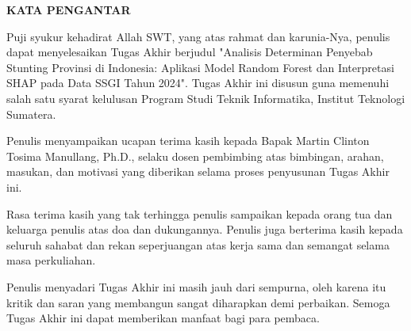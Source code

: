 \clearpage
{}%

\begin{justifying}
	\large \bfseries \centering \MakeUppercase{Kata Pengantar}\linebreak
	
	\normalsize \normalfont \justifying
	Puji syukur kehadirat Allah SWT, yang atas rahmat dan karunia-Nya, penulis dapat menyelesaikan Tugas Akhir berjudul "Analisis Determinan Penyebab Stunting Provinsi di Indonesia: Aplikasi Model Random Forest dan Interpretasi SHAP pada Data SSGI Tahun 2024". Tugas Akhir ini disusun guna memenuhi salah satu syarat kelulusan Program Studi Teknik Informatika, Institut Teknologi Sumatera.

	Penulis menyampaikan ucapan terima kasih kepada Bapak Martin Clinton Tosima Manullang, Ph.D., selaku dosen pembimbing atas bimbingan, arahan, masukan, dan motivasi yang diberikan selama proses penyusunan Tugas Akhir ini.

	Rasa terima kasih yang tak terhingga penulis sampaikan kepada orang tua dan keluarga penulis atas doa dan dukungannya. Penulis juga berterima kasih kepada seluruh sahabat dan rekan seperjuangan atas kerja sama dan semangat selama masa perkuliahan.

	Penulis menyadari Tugas Akhir ini masih jauh dari sempurna, oleh karena itu kritik dan saran yang membangun sangat diharapkan demi perbaikan. Semoga Tugas Akhir ini dapat memberikan manfaat bagi para pembaca.	
	\vfill
	
\end{justifying}
\clearpage





